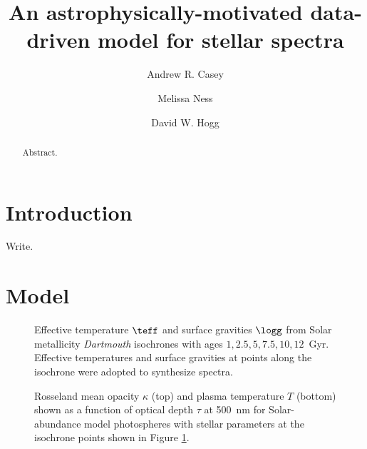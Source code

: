 \documentclass{aastex61}
\newcommand{\project}[1]{\textsl{#1}}
\begin{document}
\title{An astrophysically-motivated data-driven model for stellar spectra}



\author[0000-0003-0174-0564]{Andrew R. Casey}


\author{Melissa Ness}


\author{David W. Hogg}

 


\begin{abstract}
Abstract.
\end{abstract}

\keywords{}

\section{Introduction} 
\label{sec:introduction}
Write.


\section{Model}
\label{sec:model}


\begin{figure}
	\caption{
		Effective temperature $\teff$ and surface gravities $\logg$ from
		Solar metallicity \project{Dartmouth} isochrones \citep{dartmouth}
		with ages ${1, 2.5, 5, 7.5, 10, 12}$~Gyr. Effective temperatures
		and surface gravities at points along the isochrone were adopted
		to synthesize spectra.\label{fig:simple_solar_isochrone}}
\end{figure}


\begin{figure}
	\caption{
		Rosseland mean opacity $\kappa$ (top) and plasma temperature $T$ 
		(bottom) shown as a function of optical depth $\tau$ at 500~nm
		for Solar-abundance model photospheres with stellar parameters
		at the isochrone points shown in Figure \ref{fig:simple_solar_isochrone}.
		\label{fig:simple_photospheric_properties}}
\end{figure}
\end{document}
